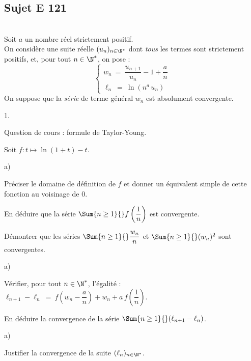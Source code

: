 \documentclass[11pt]{article}%
\begin{document}
\subsection*{Sujet E 121}


\begin{exerciceAP}~\\
  Soit $a$ un nombre réel strictement positif.\\
  On considère une suite réelle $(u_n)_{n \in \N^*}$ dont {\it tous}
  les termes sont strictement positifs, et, pour tout $n \in \N^*$, on
  pose :
  \[
    \left\{
      \begin{array}{l}
        w_n \ = \ \dfrac{u_{n+1}}{u_n} - 1 + \dfrac{a}{n}
        \\[.3cm]
        \ell_n \ = \ \ln\left(n^a \, u_n\right)
      \end{array}
    \right.
  \]
  On suppose que la {\it série} de terme général $w_n$ est absolument
  convergente.
  \begin{noliste}{1.}
  \item Question de cours : formule de Taylor-Young.
    
  \item Soit $f: t \mapsto \ln(1+t) -t$.
    \begin{noliste}{a)}
    \item Préciser le domaine de définition de $f$ et donner un
      équivalent simple de cette fonction au voisinage de $0$.
      
    \item En déduire que la série $\Sum{n \geq 1}{} f\left(
        \dfrac{1}{n} \right)$ est convergente.
    \end{noliste}
    
  \item Démontrer que les séries $\Sum{n \geq 1}{} \dfrac{w_n}{n}$
    et $\Sum{n \geq 1}{} (w_n)^2$ sont convergentes.
    
  \item 
    \begin{noliste}{a)}
    \item Vérifier, pour tout $n \in \N^*$, l'égalité : $\ell_{n+1} -
      \ell_n \ = \ f\left(w_n - \dfrac{a}{n}\right) + w_n + a \, f
      \left( \dfrac{1}{n}\right)$.
      
    \item En déduire la convergence de la série $\Sum{n \geq 1}{}
      (\ell_{n+1} - \ell_n)$.
    \end{noliste}
    
  \item 
    \begin{noliste}{a)}
    \item Justifier la convergence de la suite $(\ell_n)_{n \in \N^*}$.
      

\end{noliste}
\end{noliste}
\end{exerciceAP}
\end{document}
